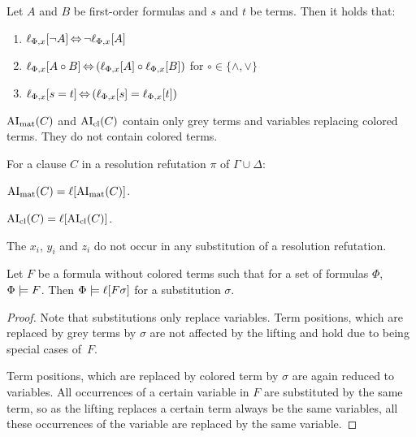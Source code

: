 \documentclass[,%
	paper=a4,%
	twoside=false,%
	liststotoc,
	bibtotoc,
	draft=false,%
	numbers=noendperiod
]{scrartcl}
\begin{document}
\begin{lemma}
	\label{lemma:lift_logic_commute}
	Let $A$ and $B$ be first-order formulas and $s$ and $t$ be terms. Then it holds that:
	\begin{enumerate}
		\item $\lift{\Phi}{\lnot A}{x} \semiff{} \lnot \lift{\Phi}{A}{x}$
		\item $\lift{\Phi}{A \circ B}{x} \semiff{} ( \lift{\Phi}{A}{x} \circ \lift{\Phi}{B}{x} )$ for  $\circ \in     \{\land, \lor\}$
		\item $\lift{\Phi}{s = t}{x} \semiff{} ( \lift{\Phi}{s}{x} = \lift{\Phi}{t}{x} )$
	\end{enumerate}
\end{lemma}



\begin{lemma}
	\label{lemma:no_colored_terms}
	$\AImatrix(C)$ and $\AIclause(C)$ contain only grey terms and variables replacing colored terms. They do not contain colored terms.
\end{lemma}



\begin{corr}
  \label{corr:lift_ai}
  For a clause $C$ in a resolution refutation $\pi$ of $\Gamma \cup \Delta$:
  \begin{compactenum}
    \item $\AImatrix(C) = \lifboth{\AImatrix(C)}$.

    \item $\AIclause(C) = \lifboth{\AIclause(C)}$.
  \end{compactenum}
\end{corr}

\begin{lemma}
  The $x_i$, $y_i$ and $z_i$ do not occur in any substitution of a resolution refutation.
\end{lemma}

\begin{lemma}
	\label{lemma:substitute_and_lift}
	Let $F$ be a formula without colored terms such that for a set of formulas $\Phi$, $\Phi \entails F$.
	Then $\Phi \entails \lifboth{F\sigma}$ for a substitution $\sigma$.
\end{lemma}
\begin{proof}
	Note that substitutions only replace variables. Term positions, which are replaced by grey terms by $\sigma$ are not affected by the lifting and hold due to being special cases of~$F$.

	Term positions, which are replaced by colored term by $\sigma$ are again reduced to variables.
	All occurrences of a certain variable in $F$ are substituted by the same term, so as the lifting replaces a certain term always be the same variables, all these occurrences of the variable are replaced by the same variable.
\end{proof}
\end{document}
